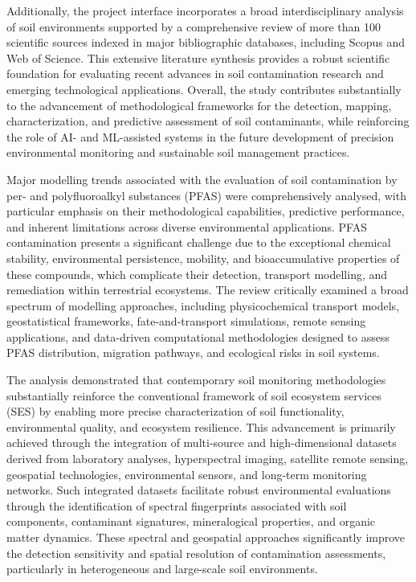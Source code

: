 \documentclass[preprint,12pt]{elsarticle}            %
\begin{document}
Additionally, the project interface incorporates a broad interdisciplinary
analysis of soil environments supported by a comprehensive review of more than
100 scientific sources indexed in major bibliographic databases, including
Scopus and Web of Science. This extensive literature synthesis provides a
robust scientific foundation for evaluating recent advances in soil
contamination research and emerging technological applications. Overall, the
study contributes substantially to the advancement of methodological frameworks
for the detection, mapping, characterization, and predictive assessment of soil
contaminants, while reinforcing the role of AI- and ML-assisted systems in the
future development of precision environmental monitoring and sustainable soil
management practices.

Major modelling trends associated with the evaluation of soil contamination by
per- and polyfluoroalkyl substances (PFAS) were comprehensively analysed, with
particular emphasis on their methodological capabilities, predictive
performance, and inherent limitations across diverse environmental
applications. PFAS contamination presents a significant challenge due to the
exceptional chemical stability, environmental persistence, mobility, and
bioaccumulative properties of these compounds, which complicate their
detection, transport modelling, and remediation within terrestrial ecosystems.
The review critically examined a broad spectrum of modelling approaches,
including physicochemical transport models, geostatistical frameworks,
fate-and-transport simulations, remote sensing applications, and data-driven
computational methodologies designed to assess PFAS distribution, migration
pathways, and ecological risks in soil systems.

The analysis demonstrated that contemporary soil monitoring methodologies
substantially reinforce the conventional framework of soil ecosystem services
(SES) by enabling more precise characterization of soil functionality,
environmental quality, and ecosystem resilience. This advancement is primarily
achieved through the integration of multi-source and high-dimensional datasets
derived from laboratory analyses, hyperspectral imaging, satellite remote
sensing, geospatial technologies, environmental sensors, and long-term
monitoring networks. Such integrated datasets facilitate robust environmental
evaluations through the identification of spectral fingerprints associated with
soil components, contaminant signatures, mineralogical properties, and organic
matter dynamics. These spectral and geospatial approaches significantly improve
the detection sensitivity and spatial resolution of contamination assessments,
particularly in heterogeneous and large-scale soil environments.
\end{document}
